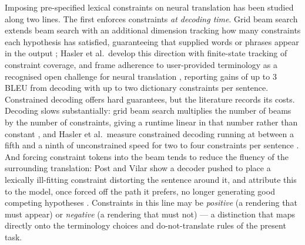 Imposing pre-specified lexical constraints on neural translation has
been studied along two lines. The first enforces constraints
\emph{at decoding time}. Grid beam search extends beam search with an
additional dimension tracking how many constraints each hypothesis has
satisfied, guaranteeing that supplied words or phrases appear in the
output \cite{hokamp2017gbs}; Hasler et al.\ develop this direction
with finite-state tracking of constraint coverage, and frame adherence
to user-provided terminology as a recognised open challenge for neural
translation \cite{hasler2018terminology}, reporting gains of up to
3 BLEU from decoding with up to two dictionary constraints per
sentence.
Constrained decoding offers hard guarantees, but the literature
records its costs. Decoding slows substantially: grid beam search
multiplies the number of beams by the number of constraints, giving a
runtime linear in that number rather than constant
\cite{hokamp2017gbs}, and Hasler et al.\ measure constrained decoding
running at between a fifth and a ninth of unconstrained speed for two
to four constraints per sentence \cite{hasler2018terminology}. And
forcing constraint tokens into the beam tends to reduce the fluency of
the surrounding translation: Post and Vilar show a decoder pushed to
place a lexically ill-fitting constraint distorting the sentence
around it, and attribute this to the model, once forced off the path
it prefers, no longer generating good competing hypotheses
\cite{post2018dba}.
Constraints in this line may be \emph{positive} (a rendering that must
appear) or \emph{negative} (a rendering that must not) --- a
distinction that maps directly onto the terminology choices and
do-not-translate rules of the present task.

